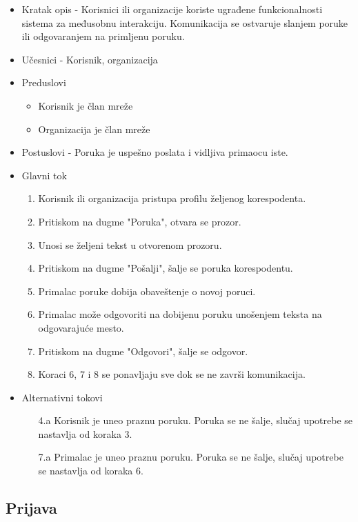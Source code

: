\begin{itemize}
\item Kratak opis - Korisnici ili organizacije koriste ugrađene funkcionalnosti sistema za međusobnu interakciju. Komunikacija se ostvaruje slanjem poruke ili odgovaranjem na primljenu poruku.
\item Učesnici - Korisnik, organizacija
\item Preduslovi 
    \begin{itemize}
	\item Korisnik je član mreže
	\item Organizacija je član mreže
	\end{itemize}
\item Postuslovi - Poruka je uspešno poslata i vidljiva primaocu iste.
\item Glavni tok
	\begin{enumerate}
		\item Korisnik ili organizacija pristupa profilu željenog korespodenta.
		\item Pritiskom na dugme "Poruka", otvara se prozor. 
		\item Unosi se željeni tekst u otvorenom prozoru. 
		\item Pritiskom na dugme "Pošalji", šalje se poruka korespodentu.
		\item Primalac poruke dobija obaveštenje o novoj poruci.
		\item Primalac može odgovoriti na dobijenu poruku unošenjem teksta na odgovarajuće mesto.
		\item Pritiskom na dugme "Odgovori", šalje se odgovor.
		\item Koraci 6, 7 i 8 se ponavljaju sve dok se ne završi komunikacija.
	\end{enumerate}
\item Alternativni tokovi
    \begin{itemize}
		\item[4.a] Korisnik je uneo praznu poruku. Poruka se ne šalje, slučaj upotrebe se nastavlja od koraka 3.
		\item[7.a] Primalac je uneo praznu poruku. Poruka se ne šalje, slučaj upotrebe se nastavlja od koraka 6.
	\end{itemize}
\end{itemize}


\subsection{Prijava}
